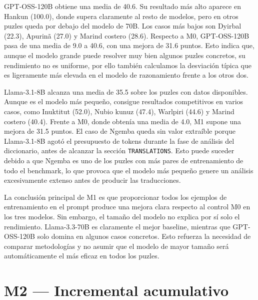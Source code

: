 GPT-OSS-120B obtiene una media de 40.6. Su resultado más alto aparece en Hankun (100.0), donde supera claramente al resto de modelos, pero en otros puzles queda por debajo del modelo de 70B. Los casos más bajos son Dyirbal (22.3), Apurinã (27.0) y Marind costero (28.6). Respecto a M0, GPT-OSS-120B pasa de una media de 9.0 a 40.6, con una mejora de 31.6 puntos. Esto indica que, aunque el modelo grande puede resolver muy bien algunos puzles concretos, su rendimiento no es uniforme, por ello también calculamos la desviación típica que es ligeramente más elevada en el modelo de razonamiento frente a los otros dos.

Llama-3.1-8B alcanza una media de 35.5 sobre los puzles con datos disponibles. Aunque es el modelo más pequeño, consigue resultados competitivos en varios casos, como Inuktitut (52.0), Nubio kunuz (47.4), Warlpiri (44.6) y Marind costero (40.4). Frente a M0, donde obtenía una media de 4.0, M1 supone una mejora de 31.5 puntos. El caso de Ngemba queda sin valor extraíble porque Llama-3.1-8B agotó el presupuesto de tokens durante la fase de análisis del diccionario, antes de alcanzar la sección \texttt{TRANSLATIONS}. Esto puede suceder debido a que Ngemba es uno de los puzles con más pares de entrenamiento de todo el benchmark, lo que provoca que el modelo más pequeño genere un análisis excesivamente extenso antes de producir las traducciones.

La conclusión principal de M1 es que proporcionar todos los ejemplos de entrenamiento en el prompt produce una mejora clara respecto al control M0 en los tres modelos. Sin embargo, el tamaño del modelo no explica por sí solo el rendimiento. Llama-3.3-70B es claramente el mejor baseline, mientras que GPT-OSS-120B solo domina en algunos casos concretos. Esto refuerza la necesidad de comparar metodologías y no asumir que el modelo de mayor tamaño será automáticamente el más eficaz en todos los puzles.

\section{M2 — Incremental acumulativo}
\label{sec:resultados_m2}

